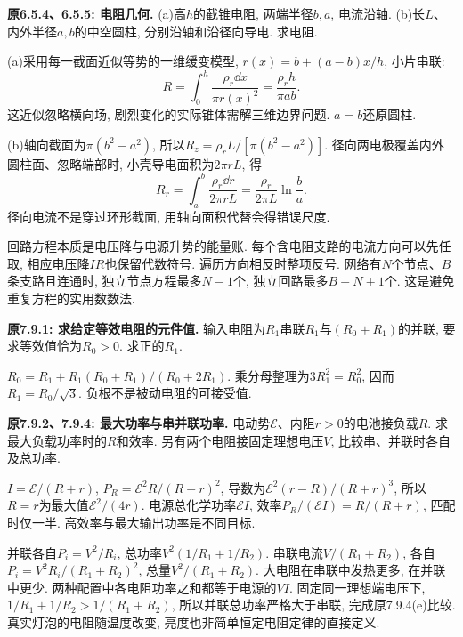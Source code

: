 \begin{example}
\textbf{原6.5.4、6.5.5: 电阻几何.} 
(a)高$h$的截锥电阻, 两端半径$b,a$, 电流沿轴. (b)长$L$、内外半径$a,b$的中空圆柱, 分别沿轴和沿径向导电. 求电阻.
\end{example}
\begin{solution}
(a)采用每一截面近似等势的一维缓变模型, $r(x)=b+(a-b)x/h$, 小片串联:
\[R=\int_0^h\frac{\rho_r\dd x}{\pi r(x)^2}=\frac{\rho_r h}{\pi ab}.\]
这近似忽略横向场, 剧烈变化的实际锥体需解三维边界问题. $a=b$还原圆柱.

(b)轴向截面为$\pi(b^2-a^2)$, 所以$R_z=\rho_rL/[\pi(b^2-a^2)]$. 径向两电极覆盖内外圆柱面、忽略端部时, 小壳导电面积为$2\pi rL$, 得
\[R_r=\int_a^b\frac{\rho_r\dd r}{2\pi rL}=\frac{\rho_r}{2\pi L}\ln\frac ba.\]
径向电流不是穿过环形截面, 用轴向面积代替会得错误尺度.
\end{solution}

\label{tb:kirchhoff-examples}
回路方程本质是电压降与电源升势的能量账. 每个含电阻支路的电流方向可以先任取, 相应电压降$IR$也保留代数符号. 遍历方向相反时整项反号. 网络有$N$个节点、$B$条支路且连通时, 独立节点方程最多$N-1$个, 独立回路最多$B-N+1$个. 这是避免重复方程的实用数数法.

\begin{example}
\textbf{原7.9.1: 求给定等效电阻的元件值.} 
输入电阻为$R_1$串联$R_1$与$(R_0+R_1)$的并联, 要求等效值恰为$R_0>0$. 求正的$R_1$.
\end{example}
\begin{solution}
$R_0=R_1+R_1(R_0+R_1)/(R_0+2R_1)$. 乘分母整理为$3R_1^2=R_0^2$, 因而$R_1=R_0/\sqrt3$. 负根不是被动电阻的可接受值.
\end{solution}

\begin{example}
\textbf{原7.9.2、7.9.4: 最大功率与串并联功率.} 
电动势$\mathcal E$、内阻$r>0$的电池接负载$R$. 求最大负载功率时的$R$和效率. 另有两个电阻接固定理想电压$V$, 比较串、并联时各自及总功率.
\end{example}
\begin{solution}
$I=\mathcal E/(R+r)$, $P_R=\mathcal E^2R/(R+r)^2$, 导数为$\mathcal E^2(r-R)/(R+r)^3$, 所以$R=r$为最大值$\mathcal E^2/(4r)$. 电源总化学功率$\mathcal EI$, 效率$P_R/(\mathcal EI)=R/(R+r)$, 匹配时仅一半. 高效率与最大输出功率是不同目标.

并联各自$P_i=V^2/R_i$, 总功率$V^2(1/R_1+1/R_2)$. 串联电流$V/(R_1+R_2)$, 各自$P_i=V^2R_i/(R_1+R_2)^2$, 总量$V^2/(R_1+R_2)$. 大电阻在串联中发热更多, 在并联中更少. 两种配置中各电阻功率之和都等于电源的$VI$. 固定同一理想端电压下,$1/R_1+1/R_2>1/(R_1+R_2)$, 所以并联总功率严格大于串联, 完成原7.9.4(e)比较. 真实灯泡的电阻随温度改变, 亮度也非简单恒定电阻定律的直接定义.
\end{solution}

